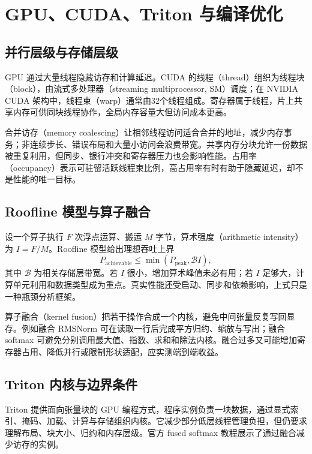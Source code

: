 \setcounter{chapter}{27} %
\chapter{GPU、CUDA、Triton 与编译优化}
\label{ch:kernels}

\section{并行层级与存储层级}

GPU 通过大量线程隐藏访存和计算延迟。CUDA 的线程（thread）组织为线程块（block），由流式多处理器（streaming multiprocessor, SM）调度；在 NVIDIA CUDA 架构中，线程束（warp）通常由32个线程组成。寄存器属于线程，片上共享内存可供同块线程协作，全局内存容量大但访问成本更高\cite{cuda}。

合并访存（memory coalescing）让相邻线程访问适合合并的地址，减少内存事务；非连续步长、错误布局和大量小访问会浪费带宽。共享内存分块允许一份数据被重复利用，但同步、银行冲突和寄存器压力也会影响性能。占用率（occupancy）表示可驻留活跃线程束比例，高占用率有时有助于隐藏延迟，却不是性能的唯一目标。

\section{Roofline 模型与算子融合}

设一个算子执行 $F$ 次浮点运算、搬运 $M$ 字节，算术强度（arithmetic intensity）为 $I=F/M$。Roofline 模型给出理想吞吐上界
\[
P_{\mathrm{achievable}}\le\min(P_{\mathrm{peak}},\mathcal B I),
\]
其中 $\mathcal B$ 为相关存储层带宽。若 $I$ 很小，增加算术峰值未必有用；若 $I$ 足够大，计算单元利用和数据类型成为重点。真实性能还受启动、同步和依赖影响，上式只是一种瓶颈分析框架。

算子融合（kernel fusion）把若干操作合成一个内核，避免中间张量反复写回显存。例如融合 RMSNorm 可在读取一行后完成平方归约、缩放与写出；融合 softmax 可避免分别调用最大值、指数、求和和除法内核。融合过多又可能增加寄存器占用、降低并行或限制形状适配，应实测端到端收益。

\section{Triton 内核与边界条件}

Triton 提供面向张量块的 GPU 编程方式，程序实例负责一块数据，通过显式索引、掩码、加载、计算与存储组织内核。它减少部分低层线程管理负担，但仍要求理解布局、块大小、归约和内存层级。官方 fused softmax 教程展示了通过融合减少访存的实例\cite{triton}。

